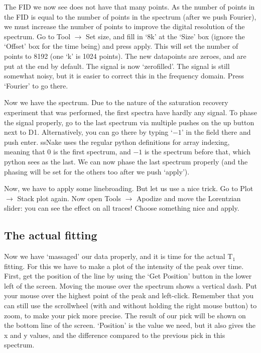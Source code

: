 \documentclass[11pt,a4paper]{article}
\begin{document}
The FID we now see does not have that many points. As the number of points in the FID is equal to the number of points in the spectrum (after we push Fourier), we must increase the number of points to improve the digital resolution of the spectrum. Go to Tool $\rightarrow$ Set size, and fill in `8k' at the `Size' box (ignore the `Offset' box for the time being) and press apply. This will set the number of points to 8192 (one `k' is 1024 points). The new datapoints are zeroes, and are put at the end by default. The signal is now `zerofilled'. The signal is still somewhat noisy, but it is easier to correct this in the frequency domain. Press `Fourier' to go there.

Now we have the spectrum. Due to the nature of the saturation recovery experiment that was performed, the first spectra have hardly any signal. To phase the signal properly, go to the last spectrum via multiple pushes on the up button next to D1. Alternatively, you can go there by typing `$-1$' in the field there and push enter. ssNake uses the regular python definitions for array indexing, meaning that 0 is the first spectrum, and $-1$ is the spectrum before that, which python sees as the last. We can now phase the last spectrum properly (and the phasing will be set for the others too after we push `apply').

Now, we have to apply some linebroading. But let us use a nice trick. Go to Plot $\rightarrow$ Stack plot again. Now open Tools $\rightarrow$ Apodize and move the Lorentzian slider: you can see the effect on all traces! Choose something nice and apply. 

\subsection{The actual fitting}
Now we have `massaged' our data properly, and it is time for the actual T$_1$ fitting. For this we have to make a plot of the intensity of the peak over time. First, get the position of the line
by using the `Get Position' button in the lower left of the screen. Moving the mouse over the spectrum shows a vertical dash. Put your mouse over the highest point of the peak and left-click. Remember that you can still use the scrollwheel (with and without holding the right mouse button) to zoom, to make your pick more precise. The result of our pick will be shown on the bottom line of the screen. `Position' is the value we need, but it also gives the x and y values, and the difference compared to the previous pick in this spectrum.
\end{document}
